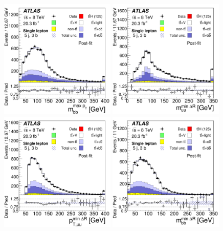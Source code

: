 \clearpage

\begin{figure}[tp]
\begin{center}
\includegraphics[width=0.49\textwidth]{Appendices/Figures_separation/mbb_maxPt_flav_5.pdf}
\includegraphics[width=0.49\textwidth]{Appendices/Figures_separation/WhadM_flav_5.pdf} \\
\includegraphics[width=0.49\textwidth]{Appendices/Figures_separation/WhadSpt_flav_5.pdf}
\includegraphics[width=0.49\textwidth]{Appendices/Figures_separation/mbb_mindR_flav_5.pdf}

\end{center}
\end{figure}
